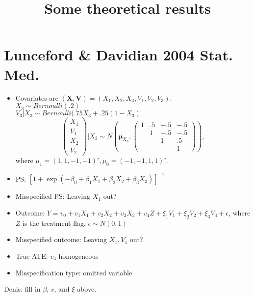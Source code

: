 \documentclass{article}
\title{Some theoretical results}
\begin{document}
\section{Lunceford \& Davidian 2004 Stat. Med.}
\begin{itemize}
\item
Covariates are $(\mathbf{X, V}) = (X_1, X_2, X_3, V_1, V_2, V_3)$.  \\
$X_3 \sim Bernoulli(.2)$\\
$V_3 |X_3 \sim Bernoulli( .75X_3 +.25(1-X_3)$\\
\begin{displaymath}
\begin{pmatrix}X_1\\ V_1 \\X_2\\V_2  \end{pmatrix} | X_3 \sim 
N(\boldsymbol\mu_{X_3} , \begin{pmatrix}
	1 & .5 & -.5 & -.5\\
	   & 1 & -.5 & -.5 \\
	    &   & 1  & .5 \\
	    &  &   &  1
\end{pmatrix}),
\end{displaymath}
where $\mu_1 = (1, 1, -1, -1)', \mu_0 = (-1, -1, 1, 1)'$.
\item
PS:  $[ 1 + \exp( - \beta_0 + \beta_1X_1 + \beta_2X_2 + \beta_3X_3)]^{-1}$
\item 
Misspecified PS: {\color{red} Leaving $X_1$ out?}
\item 
Outcome: $Y=v_0 +v_1X_1+v_2X_2+v_3X_3+v_4Z + \xi_1V_1+\xi_2V_2+
\xi_3V_3 + \epsilon$, where $Z$ is the treatment flag, $\epsilon \sim N(0,1)$
\item 
Misspecified outcome: {\color{red} Leaving $X_1, V_1$ out?}
\item True ATE: $v_4$ homogeneous
\item Misspecification type: omitted variable 
\end{itemize}
{\color{red}Denis: fill in $\beta$, $v$, and $\xi$  above.}
\end{document}
